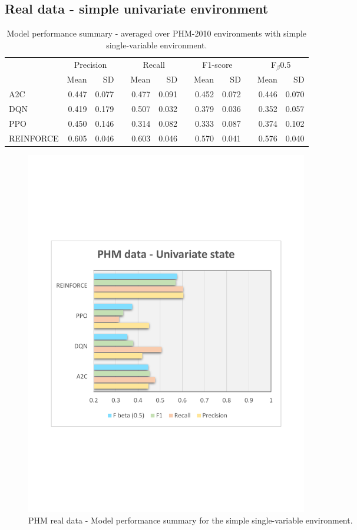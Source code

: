 \documentclass[a4paper, 12pt]{article}
\newcommand{\rowspace}[1]{\renewcommand{\arraystretch}{#1}}
\begin{document}
\subsection{Real data - simple univariate environment}
\begin{table}[h]\centering
	\sffamily
	\rowspace{1.3}
	\begin{tabular}{@{}l rr c rr c rr c rr@{}}
		\arrayrulecolor{black!40}\toprule
		& \multicolumn{2}{c}{Precision} & \phantom{i} & \multicolumn{2}{c}{Recall} & \phantom{i} & \multicolumn{2}{c}{F1-score} & \phantom{i} & \multicolumn{2}{c}{F$_\beta$0.5} \\
		\cmidrule{2-3} \cmidrule{5-6} \cmidrule{8-9} \cmidrule{11-12} 
		
		&Mean &SD & &Mean &SD & &Mean &SD& &Mean & SD\\ \midrule
		A2C & 0.447 & 0.077 & &0.477 & 0.091 & & 0.452 & 0.072 & &0.446 &0.070 \\
		DQN & 0.419 & 0.179 & &0.507 & 0.032 & & 0.379 & 0.036 & &0.352 &0.057 \\
		PPO & 0.450 & 0.146 & &0.314 & 0.082 & & 0.333 & 0.087 & &0.374 &0.102 \\
		REINFORCE & \textcolor{dblue}{0.605} & 0.046 & &\textcolor{dblue}{0.603} & 0.046 & & \textcolor{dblue}{0.570} & 0.041 & &\textcolor{dblue}{0.576} &0.040 \\
		
		\bottomrule
	\end{tabular}
	\caption{Model performance summary - averaged over PHM-2010 environments with simple single-variable environment.}
	\label{tbl:PHMSS}
\end{table}
\begin{figure}[h]
	\centering
	\includegraphics[width=0.6\textwidth, trim={1.5cm 7cm 1cm 7cm}]{images/PHMSSPlot.pdf}  
	\caption{PHM real data - Model performance summary for the simple single-variable environment.}
	\label{fig:PHMSS}
\end{figure}
\end{document}
